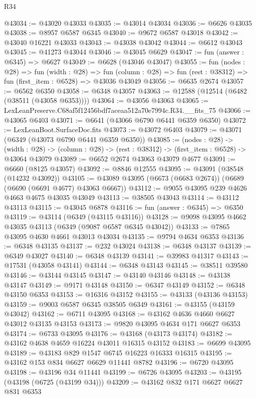 \begin{lexlean}{R34}
\begin{coremodule}
@43034 := @43020 @43033
@43035 := @43014 @43034
@43036 := @6626 @43035
@43038 := @8957 @6587 @6345
@43040 := @9672 @6587 @43018
@43042 := @43040 @16221 @43033
@43043 := @43038 @43042
@43044 := @6612 @43043
@43045 := @41273 @43044
@43046 := @43045 @6629
@43047 := fun (answer : @6345) => @6627
@43049 := @6628 (@43046 @43047)
@43055 := fun (nodes : @28) =>
  fun (width : @28) =>
  fun (column : @28) => fun (rest : @38312) => fun (first_item : @6528) => @43036 @43049
@43056 := @6635 @2674
@43057 := @6562 @6350
@43058 := @6348 @43057
@43063 := @12588 (@12514 (@6482 (@38511 (@43058 @6353))))
@43064 := @43056 @43063
@43065 := LexLeanPreserve.C68af5f12456bdf7aceaa512a70e7994c.R34.__fits_75
@43066 := @43065 @6403
@43071 := @6641 (@43066 @6790 @6441 @6359 @6350)
@43072 := LexLeanBoot.SurfaceDoc.fits
@43073 := @43072 @6403
@43079 := @43071 (@6349 (@43073 @6790 @6441 @6359 @6350))
@43085 := (nodes : @28) ->
  (width : @28) -> (column : @28) -> (rest : @38312) -> (first_item : @6528) -> @43064 @43079
@43089 := @6652 @2674 @43063 @43079 @4677
@43091 := @6660 (@8125 @43057)
@43092 := @8846 @12555
@43095 := @43091 (@38548 (@14232 @43092))
@43105 := @43089 @43095 (@6673 (@6683 @2674)) (@6689 (@6690 (@6691 @4677) @43063 @6667))
@43112 := @9055 @43095 @239 @4626 @4663 @4675 @43035 @43049
@43113 := @38505 @43043
@43114 := @43112 @43113
@43115 := @43045 @6878
@43116 := fun (answer : @6345) => @6350
@43119 := @43114 (@6349 (@43115 @43116))
@43128 := @9098 @43095 @4662 @43035 @43113 (@6349 (@9087 @6587 @6345 @43042))
@43133 := @7865 @43095 @4630 @4661 @43013 @43034
@43135 := @9794 @4634 @6353
@43136 := @6348 @43135
@43137 := @232 @43024
@43138 := @6348 @43137
@43139 := @6349 @43027
@43140 := @6348 @43139
@43141 := @39983 @41317
@43143 := @17531 (@43058 @43141)
@43144 := @6348 @43143
@43145 := @38511 @39580
@43146 := @43144 @43145
@43147 := @43140 @43146
@43148 := @43138 @43147
@43149 := @9171 @43148
@43150 := @6347 @43149
@43152 := @6348 @43150 @6353
@43153 := @16316 @43152
@43155 := @43133 (@43136 @43153)
@43159 := @9003 @6587 @6345 @38505 @6349
@43161 := @43155 (@43159 @43042)
@43162 := @6711 @43095
@43168 := @43162 @4636 @4660 @6627 @43012 @43135 @43153
@43173 := @9820 @43095 @4634 @171 @6627 @6353
@43174 := @6733 @43095
@43176 := @43168 (@43173 @43174)
@43182 := @43162 @4638 @4659 @16224 @43011 @16315 @43152
@43183 := @6699 @43095
@43189 := @43183 @829 @1547 @6745 @16223 @16333 @16315
@43195 := @43162 @153 @834 @6627 @6629 @11441 @8782
@43196 := @6720 @43095
@43198 := @43196 @34 @11441
@43199 := @6726 @43095
@43203 := @43195 (@43198 (@6725 (@43199 @34)))
@43209 := @43162 @832 @171 @6627 @6627 @831 @6353

\end{coremodule}
\end{lexlean}
